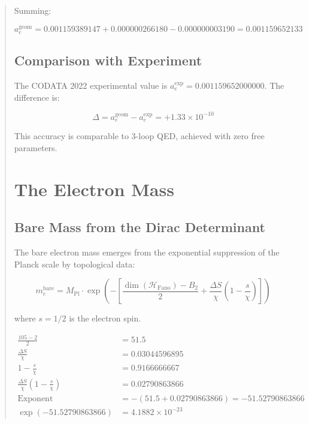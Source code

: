 \documentclass[12pt]{article}
\begin{document}
\begin{abstract}
Summing:

\begin{equation}
a_e^{\text{geom}} = 0.001159389147 + 0.000000266180 - 0.000000003190 = 0.001159652133
\end{equation}

\subsection{Comparison with Experiment}

The CODATA 2022 experimental value is \(a_e^{\text{exp}} = 0.001159652000000\). The difference is:

\begin{equation}
\Delta = a_e^{\text{geom}} - a_e^{\text{exp}} = +1.33 \times 10^{-10}
\end{equation}

This accuracy is comparable to 3-loop QED, achieved with zero free parameters.

\section{The Electron Mass}

\subsection{Bare Mass from the Dirac Determinant}

The bare electron mass emerges from the exponential suppression of the Planck scale by topological data:

\begin{equation}
\boxed{
m_e^{\text{bare}} = M_{\text{Pl}} \cdot \exp\left( - \left[ \frac{\dim(\mathcal{H}_{\text{Fano}}) - B_2}{2} + \frac{\Delta S}{\chi} \left(1 - \frac{s}{\chi}\right) \right] \right)
}
\label{eq:me_bare}
\end{equation}

where \(s = 1/2\) is the electron spin.

\begin{align}
\frac{105 - 2}{2} &= 51.5 \\
\frac{\Delta S}{\chi} &= 0.03044596895 \\
1 - \frac{s}{\chi} &= 0.9166666667 \\
\frac{\Delta S}{\chi}\left(1 - \frac{s}{\chi}\right) &= 0.02790863866 \\
\text{Exponent} &= -(51.5 + 0.02790863866) = -51.52790863866 \\
\exp(-51.52790863866) &= 4.1882 \times 10^{-23}
\end{align}


\end{abstract}
\end{document}

